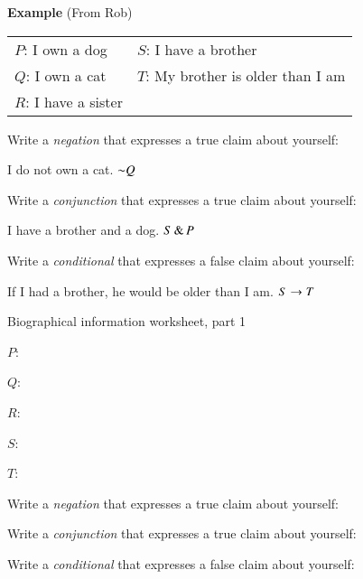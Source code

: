 \documentclass[oneside, openany]{book} %
\begin{document}
\noindent\textbf{Example} (From Rob)
\begin{longtabu}{X[1,p,m]X[1,p,m]} 
$P$: I own a dog & $S$: I have a brother \\
$Q$: I own a cat & $T$: My brother is older than I am \\
$R$: I have a sister
\end{longtabu}

\begin{exercises}
\item Write a \textit{negation }that expresses a true claim about yourself: 

\vspace{6pt}
I do not own a cat. $\mathord{\sim} Q$ 

\item Write a \textit{conjunction }that expresses a true claim about yourself: 

\vspace{6pt}
I have a brother and a dog. $S \,\&\, P$

\item Write a \textit{conditional }that expresses a false claim about yourself: 

\vspace{6pt}
If I had a brother, he would be older than I am. $S \rightarrow T$
\end{exercises}



\pagebreak

\begin{center}
{\Large Biographical information worksheet, part 1}
\end{center}
\noindent {}

\begin{ekey}
\setlength\itemsep{12pt}
\item[$P$:] 
\item[$Q$:]
\item[$R$:]
\item[$S$:]
\item[$T$:]
\end{ekey}

\begin{exercises}
\item Write a \textit{negation }that expresses a true claim about yourself: 
\vfill
\item Write a \textit{conjunction }that expresses a true claim about yourself: 
\vfill


\item Write a \textit{conditional }that expresses a false claim about yourself: 
\vfill
\end{exercises}
\end{document}
